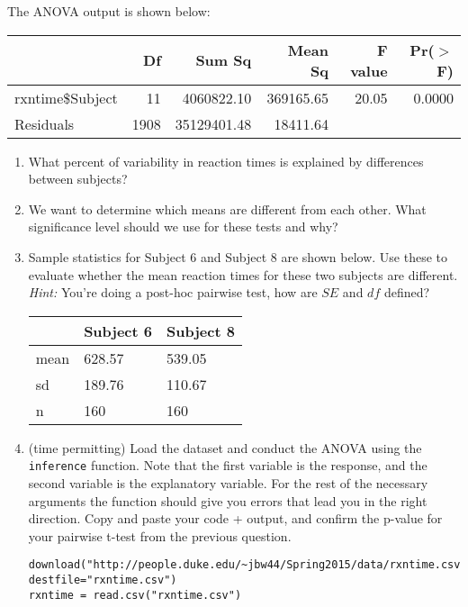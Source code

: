 \documentclass[11pt]{article}
\begin{document}
The ANOVA output is shown below:

\begin{center}
\begin{tabular}{lrrrrr}
  \hline
 & Df & Sum Sq & Mean Sq & F value & Pr($>$F) \\ 
  \hline
rxntime\$Subject & 11 & 4060822.10 & 369165.65 & 20.05 & 0.0000 \\ 
  Residuals & 1908 & 35129401.48 & 18411.64 &  &  \\ 
   \hline
\end{tabular}
\end{center}

%

\begin{enumerate}

\item What percent of variability in reaction times is explained by differences between subjects?

\item We want to determine which means are different from each other. What significance level should we use for these tests and why?

\item Sample statistics for Subject 6 and Subject 8 are shown below. Use these to evaluate whether the mean reaction times for these two subjects are different. \textit{Hint:} You're doing a post-hoc pairwise test, how are $SE$ and $df$ defined?

\begin{center}
\begin{tabular}{lll}
  \hline
 & Subject 6 & Subject 8 \\ 
  \hline
  mean & 628.57 & 539.05 \\ 
  sd & 189.76 & 110.67 \\ 
  n & 160 & 160 \\ 
   \hline
\end{tabular}
\end{center}

\item (time permitting) Load the dataset and conduct the ANOVA using the \texttt{inference} function. Note that the first variable is the response, and the second variable is the explanatory variable. For the rest of the necessary arguments the function should give you errors that lead you in the right direction. Copy and paste your code + output, and confirm the p-value for your pairwise t-test from the previous question.


\begin{verbatim}
download("http://people.duke.edu/~jbw44/Spring2015/data/rxntime.csv", destfile="rxntime.csv")
rxntime = read.csv("rxntime.csv")
\end{verbatim}

\end{enumerate}

%
\end{document}
